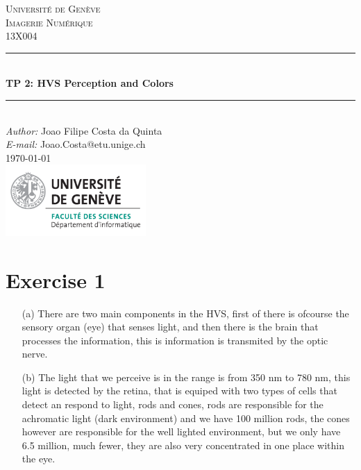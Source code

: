\documentclass[a4paper]{article}
\makeatletter
\newcommand\TPid{2}
\newcommand\TPname{HVS Perception and Colors}
\newcommand\Firstname{Joao Filipe}
\newcommand\Familyname{Costa da Quinta}
\newcommand\Email{Joao.Costa@etu.unige.ch}
\makeatother
\begin{document}
\begin{titlepage}

\newcommand{\HRule}{\rule{\linewidth}{0.5mm}} 							%
\newcommand\tab[1][1cm]{\hspace*{#1}}
\center 
 
\textsc{\LARGE Université de Genève}\\[1cm]

\textsc{\Large Imagerie Numérique}\\[0.2cm]
\textsc{\large 13X004}\\[1cm] 										%
\HRule \\[0.8cm]
{ \huge \bfseries TP \TPid : \TPname}\\[0.7cm]								%
\HRule \\[2cm]
\large
\emph{Author:} \Firstname \; \Familyname\\[0.5cm]		
\emph{E-mail:} {\color{blue}\Email}\\[7cm]		
{\large \today}\\[2cm]
\includegraphics[width=0.4\textwidth]{images/unige_csd.png}\\[1cm] 	%
\vfill 
\end{titlepage}


\section*{Exercise 1}
\begin{itemize}
\item[(a)] There are two main components in the HVS, first of there is ofcourse the sensory organ (eye) that senses light, and then there is the brain that processes the information, this is information is transmited by the optic nerve.
\item[(b)] The light that we perceive is in the range is from 350 nm to 780 nm, this light is detected by the retina, that is equiped with two types of cells that detect an respond to light, rods and cones, rods are responsible for the achromatic light (dark environment) and we have 100 million rods, the cones however are responsible for the well lighted environment, but we only have 6.5 million, much fewer, they are also very concentrated in one place within the eye.
\end{itemize}
\end{document}
